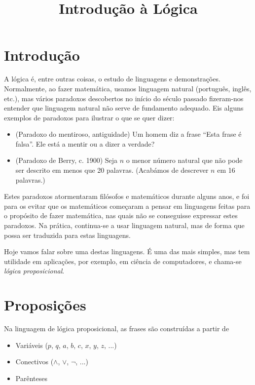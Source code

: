 \documentclass{article}
\title{Introdução à Lógica}
\author{}
\date{}
\theoremstyle{definition}
\theoremstyle{remark}
\begin{document}
	\maketitle

	\section{Introdução}

	A lógica é, entre outras coisas, o estudo de linguagens e demonstrações. Normalmente, ao fazer matemática, usamos linguagem natural (português, inglês, etc.), mas vários paradoxos descobertos no início do século passado fizeram-nos entender que linguagem natural não serve de fundamento adequado. Eis alguns exemplos de paradoxos para ilustrar o que se quer dizer:
	
	\begin{itemize}
	\item (Paradoxo do mentiroso, antiguidade) Um homem diz a frase ``Esta frase é falsa''. Ele está a mentir ou a dizer a verdade?
	
	\item (Paradoxo de Berry, c. 1900) Seja $n$ o menor número natural que não pode ser descrito em menos que 20 palavras. (Acabámos de descrever $n$ em 16 palavras.) 
	\end{itemize}
	
	Estes paradoxos atormentaram filósofos e matemáticos durante alguns anos, e foi para os evitar que os matemáticos começaram a pensar em linguagens feitas para o propósito de fazer matemática, nas quais não se conseguisse expressar estes paradoxos. Na prática, continua-se a usar linguagem natural, mas de forma que possa ser traduzida para estas linguagens.
	
	Hoje vamos falar sobre uma destas linguagens. É uma das mais simples, mas tem utilidade em aplicações, por exemplo, em ciência de computadores, e chama-se \textit{lógica proposicional}.
	
	\section{Proposições}
	
	Na linguagem de lógica proposicional, as frases são construídas a partir de
	
	\begin{itemize}
	\item Variáveis ($p$, $q$, $a$, $b$, $c$, $x$, $y$, $z$, ...)
	
	\item Conectivos ($\land$, $\lor$, $\neg$, ...)
	
	\item Parênteses
	\end{itemize}
	
\end{document}
